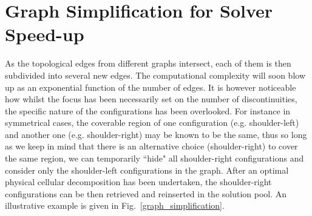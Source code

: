 \documentclass[letterpaper,journal]{IEEEtran}
\begin{document}
\section{Graph Simplification for Solver Speed-up}
\label{sectiongraphsimplification}
As the topological edges from different graphs intersect, each of them is then subdivided into several new edges. The computational complexity will soon blow up as an exponential function of the number of edges. 
It is however noticeable how whilst the focus has been necessarily set on the number of discontinuities, the specific nature of the configurations has been overlooked. 
For instance in symmetrical cases, the coverable region of one configuration (e.g. shoulder-left) and another one (e.g. shoulder-right) may be known to be the same, thus so long as we keep in mind that there is an alternative choice (shoulder-right) to cover the same region, we can temporarily ``hide" all shoulder-right configurations and consider only the shoulder-left configurations in the graph. After an optimal physical cellular decomposition has been undertaken, the shoulder-right configurations can be then retrieved and reinserted in the solution pool. 
An illustrative example is given in Fig.~\ref{graph_simplification}.
\end{document}

